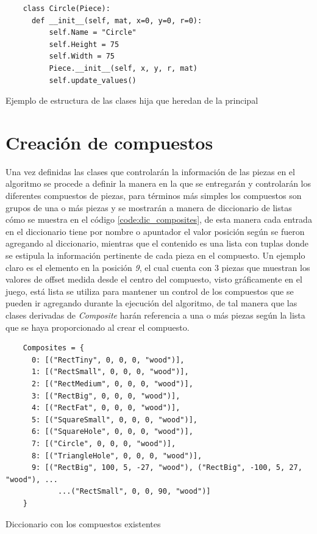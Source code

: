 \begin{listing}[ht]
  \begin{verbatim}
    class Circle(Piece):
      def __init__(self, mat, x=0, y=0, r=0):
          self.Name = "Circle"
          self.Height = 75
          self.Width = 75
          Piece.__init__(self, x, y, r, mat)
          self.update_values()
  \end{verbatim}
  \caption{Ejemplo de estructura de las clases hija que heredan de la principal}
  \label{code:dic_individual_piece}
\end{listing}

\section{Creación de compuestos}
\label{section:composite_creation}

Una vez definidas las clases que controlarán la información de las
piezas en el algoritmo se procede a definir la manera en la que se entregarán y
controlarán los diferentes compuestos de piezas, para términos más simples los
compuestos son grupos de una o más piezas y se mostrarán a manera de diccionario
de listas cómo se muestra en el código \ref{code:dic_composites}, de esta manera
cada entrada en el diccionario tiene por nombre o apuntador el valor posición
según se fueron agregando al diccionario, mientras que el contenido es una lista
con tuplas donde se estipula la información pertinente de cada pieza en el
compuesto. Un ejemplo claro es el elemento en la posición \textit{9}, el cual
cuenta con 3 piezas que muestran los valores de offset medida desde el centro
del compuesto, visto gráficamente en el juego, está lista se utiliza para
mantener un control de los compuestos que se pueden ir agregando durante la
ejecución del algoritmo, de tal manera que las clases derivadas de
\textit{Composite} harán referencia a una o más piezas según la lista que se
haya proporcionado al crear el compuesto.

\begin{listing}[ht]
  \begin{verbatim}
    Composites = {
      0: [("RectTiny", 0, 0, 0, "wood")],
      1: [("RectSmall", 0, 0, 0, "wood")],
      2: [("RectMedium", 0, 0, 0, "wood")],
      3: [("RectBig", 0, 0, 0, "wood")],
      4: [("RectFat", 0, 0, 0, "wood")],
      5: [("SquareSmall", 0, 0, 0, "wood")],
      6: [("SquareHole", 0, 0, 0, "wood")],
      7: [("Circle", 0, 0, 0, "wood")],
      8: [("TriangleHole", 0, 0, 0, "wood")],
      9: [("RectBig", 100, 5, -27, "wood"), ("RectBig", -100, 5, 27, "wood"), ...
            ...("RectSmall", 0, 0, 90, "wood")]
    } 
  \end{verbatim}
  \caption{Diccionario con los compuestos existentes}
  \label{code:dic_composites}
\end{listing}

